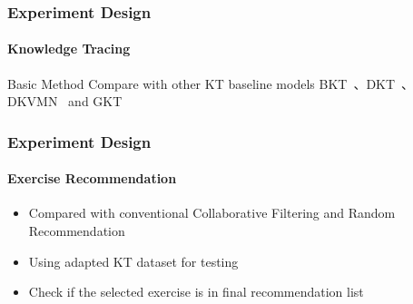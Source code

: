 \documentclass{beamer}
\begin{document}
\begin{frame}
  \frametitle{Experiment Design}
  \framesubtitle{Knowledge Tracing}
  \begin{block}{Basic Method}
    Compare with other KT baseline models BKT~\cite{yudelson2013individualized}、DKT~\cite{piech2015deep}、DKVMN~\cite{chen2017improving} and GKT~\cite{nakagawa2019graph}
  \end{block}
  \begin{table}[htbp!]
    \centering
    \caption{Dataset Statistics}\label{tbl:ch2-tb1}
  \end{table}
\end{frame}

\begin{frame}
  \frametitle{Experiment Design}
  \framesubtitle{Exercise Recommendation}
  \begin{itemize}
    \item Compared with conventional Collaborative Filtering and Random Recommendation
    \item Using adapted KT dataset for testing
    \item Check if the selected exercise is in final recommendation list
  \end{itemize}
\end{frame}
\end{document}
